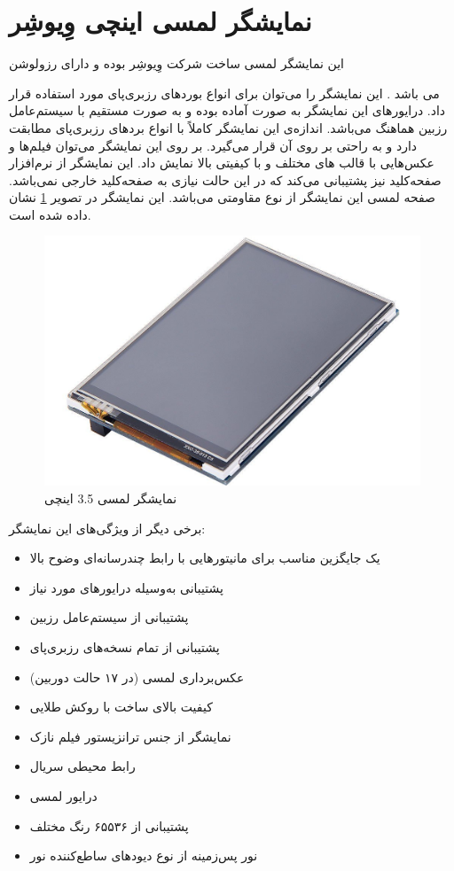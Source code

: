 \section{نمایشگر لمسی  اینچی وِیوشِر}
این نمایشگر لمسی ساخت شرکت وِیوشِر بوده و دارای رزولوشن  { می باشد . این نمایشگر را می‌توان برای انواع بوردهای رزبری‌پای مورد استفاده قرار داد. درایورهای این نمایشگر به صورت آماده بوده و به صورت مستقیم با  سیستم‌عامل رزبین هماهنگ می‌باشد. اندازه‌ی این نمایشگر کاملاً با انواع بردهای رزبری‌پای مطابقت دارد و به راحتی بر روی آن قرار می‌گیرد. بر روی این نمایشگر می‌توان فیلم‌ها و عکس‌هایی با قالب‌ های مختلف و با کیفیتی بالا نمایش داد. این نمایشگر از نرم‌افزار صفحه‌کلید نیز پشتیبانی می‌کند که در این حالت نیازی به صفحه‌کلید خارجی نمی‌باشد. صفحه لمسی این نمایشگر از نوع مقاومتی می‌باشد. این نمایشگر در تصویر \ref{lcd} نشان داده شده است.

\begin{figure}[t!]
    \centering
    \includegraphics[scale=0.30]{figures/lcd.png}
    \caption{نمایشگر لمسی 3.5 اینچی}
    \label{lcd}
\end{figure}
\clearpage
برخی دیگر از ویژگی‌های این نمایشگر:

\begin{itemize}
	\item  یک جایگزین مناسب برای مانیتورهایی با رابط چندرسانه‌ای وضوح بالا
	\item پشتیبانی به‌وسیله درایورهای مورد نیاز
	\item پشتیبانی از سیستم‌عامل رزبین
	\item پشتیبانی از تمام نسخه‌های رزبری‌پای
	\item عکس‌برداری لمسی (در ۱۷ حالت دوربین)
	\item کیفیت بالای ساخت با روکش طلایی
	\item نمایشگر از جنس ترانزیستور فیلم نازک 
	\item رابط محیطی سریال 
	\item درایور لمسی 
	\item پشتیبانی از ۶۵۵۳۶ رنگ مختلف
	\item نور پس‌زمینه از نوع دیود‌های ساطع‌کننده نور 
\end{itemize}


}

